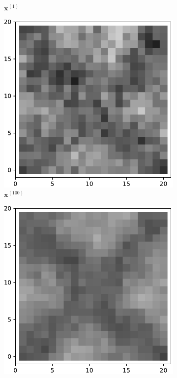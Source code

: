 \begin{figure}[!h]
\begin{subfigure}[b]{0.24\textwidth}
            \caption[]%
            {{\small $\mathbf{x}^{(1)}$}}    
            \label{fig:57.55d11}
        \end{subfigure}
        \begin{subfigure}[b]{0.24\textwidth}   
            \centering 
            \includegraphics[width=\textwidth]{./img/5755d1-99.pdf}
            \caption[]%
            {{\small $\mathbf{x}^{(100)}$}}    
            \label{fig:57.55d1100}
        \end{subfigure}
        \begin{subfigure}[b]{0.24\textwidth}   
            \centering 
            \includegraphics[width=\textwidth]{./img/5755d1mean.pdf}

\end{subfigure}
\end{figure}
